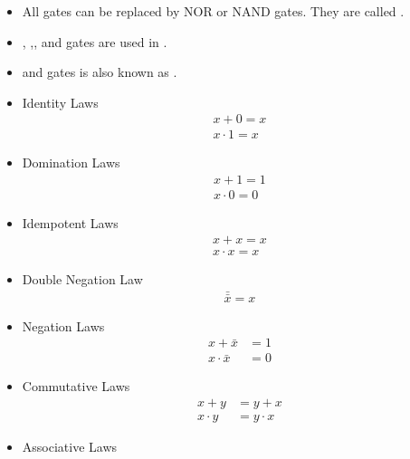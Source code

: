 \begin{multicols}{4}


    \begin{itemize}
      \item All gates can be replaced by NOR or NAND gates. They
        are called .
      \item {}, ,, and  gates are used in .
      \item {} and  gates is also known as .
    \end{itemize}

    \begin{itemize}
      \item{Identity Laws}
        \begin{align*}
          x + 0 = x \\
          x \cdot 1 = x
        \end{align*}
      \item{Domination Laws}
        \begin{align*}
          x + 1 = 1 \\
          x \cdot 0 = 0
        \end{align*}
      \item{Idempotent Laws}
        \begin{align*}
          x + x = x \\
          x \cdot x = x
        \end{align*}
      \item{Double Negation Law}
        \begin{align*}
          \bar{\bar{x}} = x
        \end{align*}
      \item{Negation Laws}
        \begin{align*}
          x + \bar{x} &= 1 \\
          x \cdot \bar{x} &= 0
        \end{align*}
      \item{Commutative Laws}
        \begin{align*}
          x + y &= y + x \\
          x \cdot y &= y \cdot x
        \end{align*}
      \item{Associative Laws}
        \begin{align*}

\end{align*}
\end{itemize}
\end{multicols}
